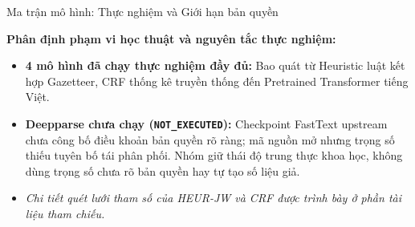 \documentclass[aspectratio=169, 9pt]{beamer}
\begin{document}
\begin{frame}{Ma trận mô hình: Thực nghiệm và Giới hạn bản quyền}
  \vspace{-0.15cm}
  \begin{center}
  \end{center}
  \vspace{0.15cm}
  {\fontsize{8.5pt}{11pt}\selectfont
  \textbf{Phân định phạm vi học thuật và nguyên tắc thực nghiệm:}
  \begin{itemize}
    \setlength{\itemsep}{2.5pt}
    \item \textbf{4 mô hình đã chạy thực nghiệm đầy đủ:} Bao quát từ Heuristic luật kết hợp Gazetteer, CRF thống kê truyền thống đến Pretrained Transformer tiếng Việt.
    \item \textbf{Deepparse chưa chạy (\texttt{NOT\_EXECUTED}):} Checkpoint FastText upstream chưa công bố điều khoản bản quyền rõ ràng; mã nguồn mở nhưng trọng số thiếu tuyên bố tái phân phối. Nhóm giữ thái độ trung thực khoa học, không dùng trọng số chưa rõ bản quyền hay tự tạo số liệu giả.
    \item \textit{Chi tiết quét lưới tham số của HEUR-JW và CRF được trình bày ở phần tài liệu tham chiếu.}
  \end{itemize}
  }
\end{frame}
\end{document}
